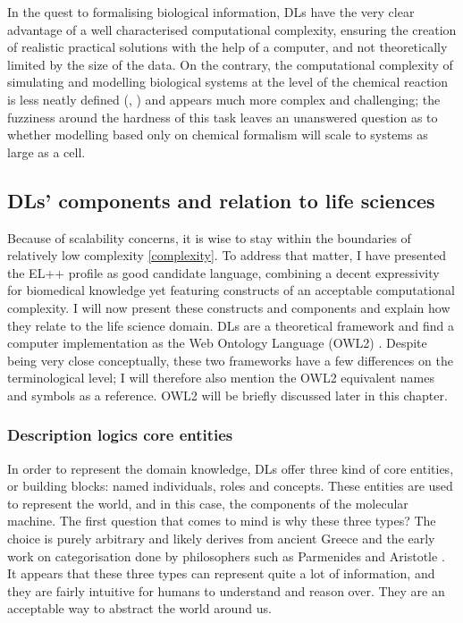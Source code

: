 In the quest to formalising biological information, DLs have the very clear advantage of a well characterised computational complexity, ensuring the creation of realistic practical solutions with the help of a computer, and not theoretically limited by the size of the data. On the contrary, the computational complexity of simulating and modelling biological systems at the level of the chemical reaction is less neatly defined (\cite{meng2004modeling}, \cite{gillespie2007stochastic}) and appears much more complex and challenging; the fuzziness around the hardness of this task leaves an unanswered question as to whether modelling based only on chemical formalism will scale to systems as large as a cell.

\subsection{DLs’ components and relation to life sciences}

Because of scalability concerns, it is wise to stay within the boundaries of relatively low complexity \ref{complexity}. To address that matter, I have presented the EL++ profile as good candidate language, combining a decent expressivity for biomedical knowledge yet featuring constructs of an acceptable computational complexity. I will now present these constructs and components and explain how they relate to the life science domain. DLs are a theoretical framework and find a computer implementation as the Web Ontology Language (OWL2) \citep{owlw3c}. Despite being very close conceptually, these two frameworks have a few differences on the terminological level; I will therefore also mention the OWL2 equivalent names and symbols as a reference. OWL2 will be briefly discussed later in this chapter.

\subsubsection{Description logics core entities}

In order to represent the domain knowledge, DLs offer three kind of core entities, or building blocks: named individuals, roles and concepts. These entities are used to represent the world, and in this case, the components of the molecular machine. The first question that comes to mind is why these three types? The choice is purely arbitrary and likely derives from ancient Greece and the early work on categorisation done by philosophers such as Parmenides and Aristotle \citep{ontologywiki}. It appears that these three types can represent quite a lot of information, and they are fairly intuitive for humans to understand and reason over. They are an acceptable way to abstract the world around us.


